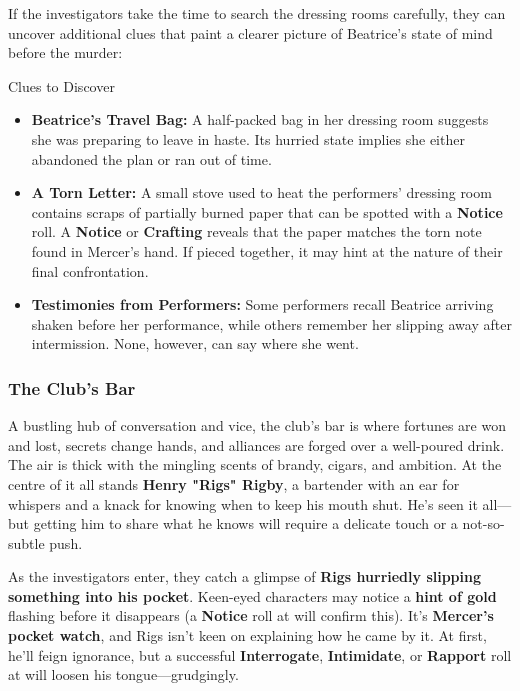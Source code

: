 If the investigators take the time to search the dressing rooms carefully, they can uncover additional clues that paint a clearer picture of Beatrice’s state of mind before the murder:  

\begin{CommentBox}{Clues to Discover}
	\begin{itemize}
		\item \textbf{Beatrice’s Travel Bag:} A half-packed bag in her dressing room suggests she was preparing to leave in haste. Its hurried state implies she either abandoned the plan or ran out of time.
		\item \textbf{A Torn Letter:} A small stove used to heat the performers' dressing room contains scraps of partially burned paper that can be spotted with a  \textbf{Notice} roll. A  \textbf{Notice} or \textbf{Crafting} reveals that the paper matches the torn note found in Mercer’s hand. If pieced together, it may hint at the nature of their final confrontation.
		\item \textbf{Testimonies from Performers:} Some performers recall Beatrice arriving shaken before her performance, while others remember her slipping away after intermission. None, however, can say where she went.
	\end{itemize}
\end{CommentBox}



\subsubsection{The Club’s Bar}  
A bustling hub of conversation and vice, the club’s bar is where fortunes are won and lost, secrets change hands, and alliances are forged over a well-poured drink. The air is thick with the mingling scents of brandy, cigars, and ambition. At the centre of it all stands \textbf{Henry "Rigs" Rigby}, a bartender with an ear for whispers and a knack for knowing when to keep his mouth shut. He’s seen it all—but getting him to share what he knows will require a delicate touch or a not-so-subtle push.

As the investigators enter, they catch a glimpse of \textbf{Rigs hurriedly slipping something into his pocket}. Keen-eyed characters may notice a \textbf{hint of gold} flashing before it disappears (a \textbf{Notice} roll at  will confirm this). It’s \textbf{Mercer’s pocket watch}, and Rigs isn’t keen on explaining how he came by it. At first, he’ll feign ignorance, but a successful \textbf{Interrogate}, \textbf{Intimidate}, or \textbf{Rapport} roll at \Formidable will loosen his tongue—grudgingly.

